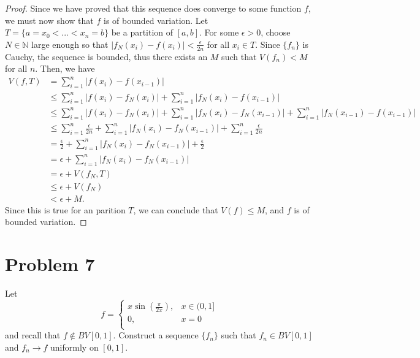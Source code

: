 \documentclass[10pt,a4paper]{article}
\theoremstyle{theorem}
\theoremstyle{definition}
\begin{document}
\begin{proof}
Since we have proved that this sequence does converge to some function $f$, we must now show that $f$ is of bounded variation. Let $T = \{a = x_0 < ... < x_n = b\}$ be a partition of $[a, b]$. For some $\epsilon > 0$, choose $N \in \mathbb{N}$ large enough so that $|f_N(x_i) - f(x_i)| < \frac{\epsilon}{2n}$ for all $x_i \in T$. Since $\{f_n\}$ is Cauchy, the sequence is bounded, thus there exists an $M$ such that $V(f_n) < M$ for all $n$. Then, we have
\begin{align*}
V(f, T) &= \sum_{i=1}^n |f(x_i) - f(x_{i - 1})|\\
&\leq \sum_{i=1}^n |f(x_i) - f_N(x_i)| + \sum_{i=1}^n |f_N(x_i) - f(x_{i - 1})| \\
&\leq \sum_{i=1}^n |f(x_i) - f_N(x_i)|  + \sum_{i=1}^n |f_N(x_i) - f_N(x_{i - 1})| + \sum_{i=1}^n |f_N(x_{i-1}) - f(x_{i - 1})| \\
&\leq \sum_{i=1}^n \frac{\epsilon}{2n}  + \sum_{i=1}^n |f_N(x_i) - f_N(x_{i - 1})| + \sum_{i=1}^n \frac{\epsilon}{2n} \\
&= \frac{\epsilon}{2} + \sum_{i=1}^n |f_N(x_i) - f_N(x_{i - 1})| + \frac{\epsilon}{2}\\
&= \epsilon + \sum_{i=1}^n |f_N(x_i) - f_N(x_{i - 1})|\\
&= \epsilon + V(f_N, T)\\
&\leq \epsilon + V(f_N)\\
&< \epsilon + M.
\end{align*}
Since this is true for an parition $T$, we can conclude that $V(f) \leq M$, and $f$ is of bounded variation.
\end{proof}

\section*{Problem 7}
Let 
\[   f = \left\{
\begin{array}{ll}
      x \sin \left( \frac{\pi}{2x} \right), &  x \in (0, 1]\\
      0, & x = 0\\
\end{array} 
\right. \]
and recall that $f \not \in BV[0, 1]$. Construct a sequence $\{f_n\}$ such that $f_n \in BV[0, 1]$ and $f_n \to f$ uniformly on $[0, 1]$.
\end{document}
